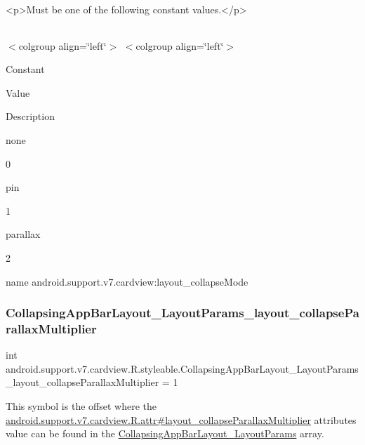 \begin{DoxyVerb}      <p>Must be one of the following constant values.</p>
\end{DoxyVerb}
 \tabulinesep=1mm
\begin{longtabu} spread 0pt [c]{*{0}{|X[-1]}|}
\hline
\end{longtabu}
$<$colgroup align=\char`\"{}left\char`\"{}$>$ $<$colgroup align=\char`\"{}left\char`\"{}$>$ 

Constant

Value

Description 

{\ttfamily none}

0

{\ttfamily pin}

1

{\ttfamily parallax}

2

name android.\+support.\+v7.\+cardview\+:layout\+\_\+collapse\+Mode \mbox{\label{classandroid_1_1support_1_1v7_1_1cardview_1_1R_1_1styleable_a9a9ccaf5bc1abaffc694f48a3f2504d3}} 
\subsubsection{\texorpdfstring{Collapsing\+App\+Bar\+Layout\+\_\+\+Layout\+Params\+\_\+layout\+\_\+collapse\+Parallax\+Multiplier}{CollapsingAppBarLayout\_LayoutParams\_layout\_collapseParallaxMultiplier}}
{\footnotesize\ttfamily int android.\+support.\+v7.\+cardview.\+R.\+styleable.\+Collapsing\+App\+Bar\+Layout\+\_\+\+Layout\+Params\+\_\+layout\+\_\+collapse\+Parallax\+Multiplier = 1\hspace{0.3cm}{\ttfamily [static]}}

This symbol is the offset where the \hyperlink{classandroid_1_1support_1_1v7_1_1cardview_1_1R_1_1attr_a4df7b2b53c53ff48c94baa005dce4ec5}{android.\+support.\+v7.\+cardview.\+R.\+attr\#layout\+\_\+collapse\+Parallax\+Multiplier} attribute\textquotesingle{}s value can be found in the \hyperlink{classandroid_1_1support_1_1v7_1_1cardview_1_1R_1_1styleable_a16f17ad190df56abdfbfa11e42898369}{Collapsing\+App\+Bar\+Layout\+\_\+\+Layout\+Params} array.

